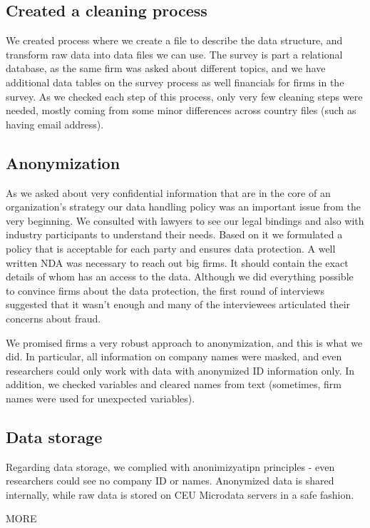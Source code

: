 \documentclass[final, dvipsnames, authoryear,12pt]{elsarticle}
\begin{document}
\subsection{Created a cleaning process}

We created process where we create a file to describe the data structure, and transform raw data into data files we can use. The survey is part a relational database, as the same firm was asked about different topics, and we have additional data tables on the survey process as well financials for firms in the survey. As we checked each step of this process, only very few cleaning steps were needed, mostly coming from some minor differences across country files (such as having email address). 

\subsection{Anonymization} 
As we asked about very confidential information that are in the core of an organization’s strategy our data handling policy was an important issue from the very beginning. We consulted with lawyers to see our legal bindings and also with industry participants to understand their needs. Based on it we formulated a policy that is acceptable for each party and ensures data protection. A well written NDA was necessary to reach out big firms. It should contain the exact details of whom has an access to the data. Although we did everything possible to convince firms about the data protection, the first round of interviews suggested that it wasn’t enough and many of the interviewees articulated their concerns about fraud.

We promised firms a very robust approach to anonymization, and this is what we did. In particular, all information on company names were masked, and even researchers could only work with data with anonymized ID information only. In addition, we checked variables and cleared names from text (sometimes, firm names were used for unexpected variables).

\subsection{Data storage}
Regarding data storage, we complied with anonimizyatipn principles - even researchers could see no company ID or names. Anonymized data is shared internally, while raw data is stored on CEU Microdata servers in a safe fashion. 

MORE
\end{document}
